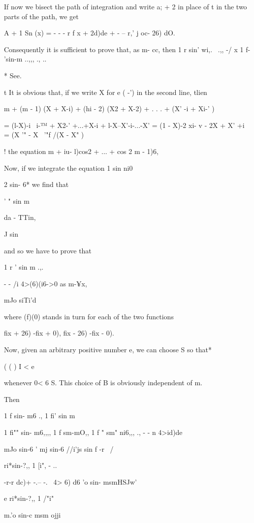 If now we bisect the path of integration and write a; + 2 in place of
t in the two parts of the path, we get

A + 1 Sn (x) = - - - r f x + 2d)de + - -- r,' j oc- 26) dO.

Consequently it is sufficient to prove that, as m- cc, then 1 r sin'
wi,. \ .,, -/ x 1 f- 'sin-m ..,,, ., ..

* See.

t It is obvious that, if we write X for e ( -') in the second line,
tlien

m + (m - 1) (X + X-i) + (hi - 2) (X2 + X-2) + . . . + (X' -i + Xi-' )

= (l-X)-i \ i-™ + X2-' +...+X-i + l-X--X'-i-...-X' = (1 - X)-2 xi- v -
2X + X' +i = (X '" - X~ '"f /(X - X" )

%
%

! the equation m + iu- l)cos2 + ... + cos 2 m - 1)6,

Now, if we integrate the equation 1 sin ni0

2 sin- 6* we find that

' " sin m

da - TTin,

J sin

and so we have to prove that

1 r ' sin m .,.

- - /i 4>(6)(i6->0 as m-¥x,

mJo siTi'd

where (f)(0) stands in turn for each of the two functions

fix + 26) -fix + 0), fix - 26) -fix - 0).

Now, given an arbitrary positive number e, we can choose S so that*

( ( ) I < e

whenever 0< 6 S. This choice of B is obviously independent of m.

Then

1 f sin- m6 ., 1 fi' sin m

1 fi"" sin- m6,,,, 1 f sm-mO,, 1 f " sm" ni6,,, ., - - n
4>id)de %

mJo sin-6 ' mj sin-6 //i'js sin f -r \ /

ri*sin-?,, 1 [i", - ..

-r-r dc)+ -.-- -. \ 4> 6) d6 'o sin- msmHSJw'

e ri*sin-?,, 1 /"i"

m.'o sin-c msm ojji

